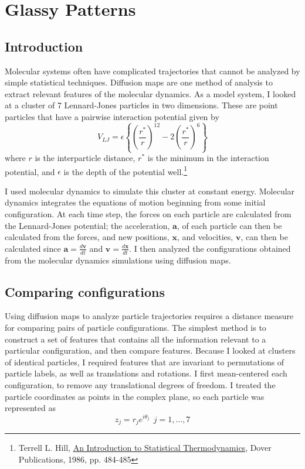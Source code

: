 
\chapter{Glassy Patterns\label{ch:glass}}

\graphicspath{{ch-glass/figures/}}

\section{Introduction}

Molecular systems often have complicated trajectories that cannot be analyzed by simple statistical techniques. Diffusion maps are one method of analysis to extract relevant features of the molecular dynamics. As a model system, I looked at a cluster of 7 Lennard-Jones particles in two dimensions. These are point particles that have a pairwise interaction potential given by
\begin{equation}
\label{LJ}
V_{LJ}=\epsilon\left\{\left(\frac{r^{*}}{r}\right)^{12}-2\left(\frac{r^{*}}{r}\right)^{6}\right\}
\end{equation}
where $r$ is the interparticle distance, $r^{*}$ is the minimum in the interaction potential, and $\epsilon$ is the depth of the potential well.\footnote{Terrell L. Hill, \underline{An Introduction to Statistical Thermodynamics}, Dover Publications, 1986, pp. 484-485} 

I used molecular dynamics to simulate this cluster at constant energy. Molecular dynamics integrates the equations of motion beginning from some initial configuration. At each time step, the forces on each particle are calculated from the Lennard-Jones potential; the acceleration, $\mathbf{a}$, of each particle can then be calculated from the forces, and new positions, $\mathbf{x}$, and velocities, $\mathbf{v}$, can then be calculated since $\mathbf{a}=\frac{d\mathbf{v}}{dt}$ and $\mathbf{v}=\frac{d\mathbf{x}}{dt}$. I then analyzed the configurations obtained from the molecular dynamics simulations using diffusion maps. 

\section{Comparing configurations}
Using diffusion maps to analyze particle trajectories requires a distance measure for comparing pairs of particle configurations. The simplest method is to construct a set of features that contains all the information relevant to a particular configuration, and then compare features. Because I looked at clusters of identical particles, I required features that are invariant to permutations of particle labels, as well as translations and rotations. I first mean-centered each configuration, to remove any translational degrees of freedom. I treated the particle coordinates as points in the complex plane, so each particle was represented as
\begin{equation}
z_j=r_{j}e^{i\theta_j} \ \ j=1,\dots,7
\end{equation}

